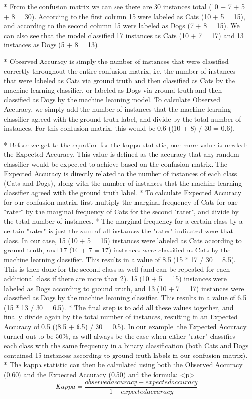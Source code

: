 * From the confusion matrix we can see there are 30 instances total (10 + 7 + 5 + 8 = 30). According to the first column 15 were labeled as Cats (10 + 5 = 15), and according to the second column 15 were labeled as Dogs (7 + 8 = 15). We can also see that the model classified 17 instances as Cats (10 + 7 = 17) and 13 instances as Dogs (5 + 8 = 13).

* Observed Accuracy is simply the number of instances that were classified correctly throughout the entire confusion matrix, i.e. the number of instances that were labeled as Cats via ground truth and then classified as Cats by the machine learning classifier, or labeled as Dogs via ground truth and then classified as Dogs by the machine learning model. To calculate Observed Accuracy, we simply add the number of instances that the machine learning classifier agreed with the ground truth label, and divide by the total number of instances. For this confusion matrix, this would be 0.6 ((10 + 8) / 30 = 0.6).

* Before we get to the equation for the kappa statistic, one more value is needed: the Expected Accuracy. This value is defined as the accuracy that any random classifier would be expected to achieve based on the confusion matrix. The Expected Accuracy is directly related to the number of instances of each class (Cats and Dogs), along with the number of instances that the machine learning classifier agreed with the ground truth label. 
* To calculate Expected Accuracy for our confusion matrix, first multiply the marginal frequency of Cats for one "rater" by the marginal frequency of Cats for the second "rater", and divide by the total number of instances. * The marginal frequency for a certain class by a certain "rater" is just the sum of all instances the "rater" indicated were that class. In our case, 15 (10 + 5 = 15) instances were labeled as Cats according to ground truth, and 17 (10 + 7 = 17) instances were classified as Cats by the machine learning classifier. This results in a value of 8.5 (15 * 17 / 30 = 8.5). This is then done for the second class as well (and can be repeated for each additional class if there are more than 2). 15 (10 + 5 = 15) instances were labeled as Dogs according to ground truth, and 13 (10 + 7 = 17) instances were classified as Dogs by the machine learning classifier. This results in a value of 6.5 (15 * 13 / 30 = 6.5). 
* The final step is to add all these values together, and finally divide again by the total number of instances, resulting in an Expected Accuracy of 0.5 ((8.5 + 6.5) / 30 = 0.5). In our example, the Expected Accuracy turned out to be 50\%, as will always be the case when either "rater" classifies each class with the same frequency in a binary classification (both Cats and Dogs contained 15 instances according to ground truth labels in our confusion matrix).
* 
The kappa statistic can then be calculated using both the Observed Accuracy (0.60) and the Expected Accuracy (0.50) and the formula:
<p>
\[Kappa = \frac{observed accuracy - expected accuracy}{1 - expected accuracy}\]

